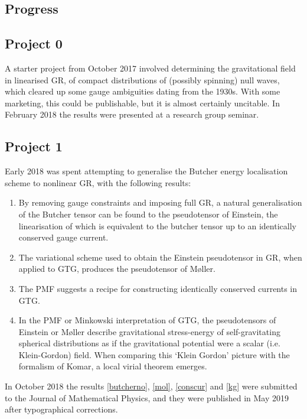 \documentclass[twoside]{report}
\begin{document}
\begin{multicols}{2}
\section{Progress}\label{progress}
\subsection{Project 0}\label{zer}
A starter project from October 2017 involved determining the gravitational field in linearised GR, of compact distributions of (possibly spinning) null waves, which cleared up some gauge ambiguities dating from the 1930s. With some marketing, this could be publishable, but it is almost certainly uncitable.
In February 2018 the results were presented \cite{sem} at a research group seminar.
\subsection{Project 1}\label{pr1}
Early 2018 was spent attempting to generalise the Butcher energy localisation scheme \cite{2014JPhCS.484a2011B,2012PhRvD..86h4012B,2012PhRvD..86h4013B} to nonlinear GR, with the following results:
\begin{enumerate}[resume]
  \item\label{butcherno} By removing gauge constraints and imposing full GR, a natural generalisation of the Butcher tensor can be found to the pseudotensor of Einstein, the linearisation of which is equivalent to the butcher tensor up to an identically conserved gauge current.
  \item\label{mol} The variational scheme used to obtain the Einstein pseudotensor in GR, when applied to GTG, produces the pseudotensor of M{\o}ller.
  \item\label{conscur} The PMF suggests a recipe for constructing identically conserved currents in GTG.
  \item\label{kg} In the PMF or Minkowski interpretation of GTG, the pseudotensors of Einstein or M{\o}ller describe gravitational stress-energy of self-gravitating spherical distributions as if the gravitational potential were a scalar (i.e. Klein-Gordon) field. When comparing this `Klein Gordon' picture with the formalism of Komar, a local virial theorem emerges.
\end{enumerate}
In October 2018 the results \ref{butcherno}, \ref{mol}, \ref{conscur} and \ref{kg} were submitted to the Journal of Mathematical Physics, and they were published \cite{2019JMP....60e2504B} in May 2019 after typographical corrections.

\end{multicols}
\end{document}
